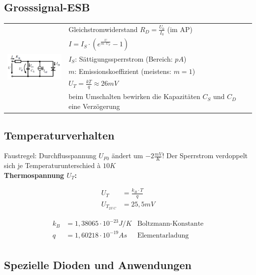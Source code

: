 	\subsection{Grosssignal-ESB}
		\begin{tabular}{l l}
			\multirow{6}{*}{\includegraphics[width=4cm]{./images/Diode-GS-ESB.png}}
			& Gleichstromwiderstand $R_D = \frac{U_0}{I_0}$ (im AP)\\
			& $I=I_S \cdot (e^{\frac{U}{m \cdot U_T}}-1)$ \\
			& $I_S$: Sättigungssperrstrom (Bereich: $pA$)\\
			& $m$: Emissionskoeffizient (meistens: $m=1$) \\
			& $U_T=\frac{kT}{q} \approx 26mV$ \\
			& beim Umschalten bewirken die Kapazitäten $C_S$ und $C_D$ eine Verzögerung \\
		\end{tabular}
		
	\subsection{Temperaturverhalten}
		Faustregel: Durchflusspannung $U_{F0}$ ändert um $-2 \frac{mV}{K}$! Der Sperrstrom verdoppelt sich je Temperaturunterschied à $10K$ \\
		
		\textbf{Thermospannung $U_T$:} \\
		\begin{minipage}{6cm}
			\begin{align*}
				U_T &= \frac{k_B \cdot T}{q} \\
				U_{T_{23^{\circ}C}} &= 25,5 mV 
			\end{align*}
		\end{minipage}
		\begin{minipage}{10cm}
			\begin{align*}
			k_B &= 1,38065 \cdot 10^{-23} J/K &\text{Boltzmann-Konstante} \\
			q &= 1,60218 \cdot 10^{-19} As &\text{Elementarladung} \\
			\end{align*}
		\end{minipage}

	
\newpage	
	\subsection{Spezielle Dioden und Anwendungen}
